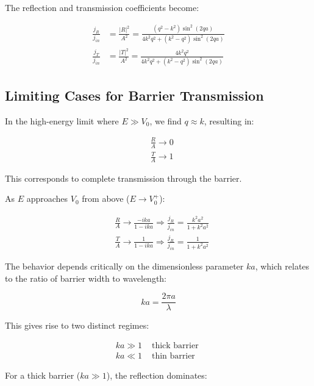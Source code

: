 \documentclass[italian]{HKNdocument}
\begin{document}
The reflection and transmission coefficients become:

\begin{align}
\frac{j_{R}}{j_{i n}} & =\frac{|R|^{2}}{A^{2}}=\frac{\left(q^{2}-k^{2}\right) \sin ^{2}(2 q a)}{4 k^{2} q^{2}+\left(k^{2}-q^{2}\right) \sin ^{2}(2 q a)} \\
\frac{j_{T}}{j_{i n}} & =\frac{|T|^{2}}{A^{2}}=\frac{4 k^{2} q^{2}}{4 k^{2} q^{2}+\left(k^{2}-q^{2}\right) \sin ^{2}(2 q a)}
\end{align}

\subsection{Limiting Cases for Barrier Transmission}

In the high-energy limit where $E \gg V_0$, we find $q \approx k$, resulting in:

\begin{align}
& \frac{R}{A} \rightarrow 0 \\
& \frac{T}{A} \rightarrow 1
\end{align}

This corresponds to complete transmission through the barrier.

As $E$ approaches $V_0$ from above ($E \rightarrow V_0^+$):

\begin{align}
& \frac{R}{A} \rightarrow \frac{-i k a}{1-i k a} \Longrightarrow \frac{j_{R}}{j_{i n}}=\frac{k^{2} a^{2}}{1+k^{2} a^{2}}  \\
& \frac{T}{A} \rightarrow \frac{1}{1-i k a} \Longrightarrow \frac{j_{R}}{j_{i n}}=\frac{1}{1+k^{2} a^{2}}
\end{align}

The behavior depends critically on the dimensionless parameter $ka$, which relates to the ratio of barrier width to wavelength:

\begin{equation}
k a=\frac{2 \pi a}{\lambda}
\end{equation}

This gives rise to two distinct regimes:

\[
\begin{array}{ll}
k a \gg 1 & \text { thick barrier } \\
k a \ll 1 & \text { thin barrier }
\end{array}
\]

For a thick barrier ($ka \gg 1$), the reflection dominates:
\end{document}
